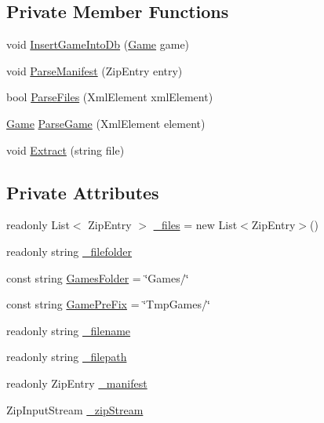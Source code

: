 \subsection*{Private Member Functions}
\begin{DoxyCompactItemize}
\item 
void \hyperlink{class_damp_server_1_1_game_handler_a1cdbb4f91b67efd0b750721637ad73d1}{Insert\-Game\-Into\-Db} (\hyperlink{class_damp_server_1_1_game}{Game} game)
\item 
void \hyperlink{class_damp_server_1_1_game_handler_a2177a153b70306618155cd0535d3514e}{Parse\-Manifest} (Zip\-Entry entry)
\item 
bool \hyperlink{class_damp_server_1_1_game_handler_abe6280c9bcd1a6815cc0ce78f1925f2b}{Parse\-Files} (Xml\-Element xml\-Element)
\item 
\hyperlink{class_damp_server_1_1_game}{Game} \hyperlink{class_damp_server_1_1_game_handler_a531bc6a74d8291ba22e1e4403af882fd}{Parse\-Game} (Xml\-Element element)
\item 
void \hyperlink{class_damp_server_1_1_game_handler_adf76f6549104a4737a898770b0ddc135}{Extract} (string file)
\end{DoxyCompactItemize}
\subsection*{Private Attributes}
\begin{DoxyCompactItemize}
\item 
readonly List$<$ Zip\-Entry $>$ \hyperlink{class_damp_server_1_1_game_handler_a8ab83176adfebd24fec732d97f703781}{\-\_\-files} = new List$<$Zip\-Entry$>$()
\item 
readonly string \hyperlink{class_damp_server_1_1_game_handler_a0be2673effb948a69bb9929a15f01a43}{\-\_\-filefolder}
\item 
const string \hyperlink{class_damp_server_1_1_game_handler_a60786795ee435b622c26f2554d662070}{Games\-Folder} = \char`\"{}Games/\char`\"{}
\item 
const string \hyperlink{class_damp_server_1_1_game_handler_a05de78325b391198d3313cfeac1851cd}{Game\-Pre\-Fix} = \char`\"{}Tmp\-Games/\char`\"{}
\item 
readonly string \hyperlink{class_damp_server_1_1_game_handler_acd4f0283bf98752e252f0e3d641a90d0}{\-\_\-filename}
\item 
readonly string \hyperlink{class_damp_server_1_1_game_handler_a0109f82d3b22ceeeb99927ee0d584794}{\-\_\-filepath}
\item 
readonly Zip\-Entry \hyperlink{class_damp_server_1_1_game_handler_a4840e3bce5396e408f0169f8e8b9a3f8}{\-\_\-manifest}
\item 
Zip\-Input\-Stream \hyperlink{class_damp_server_1_1_game_handler_a30bafe4e4ca469e21f6fe3390df4976b}{\-\_\-zip\-Stream}
\end{DoxyCompactItemize}


